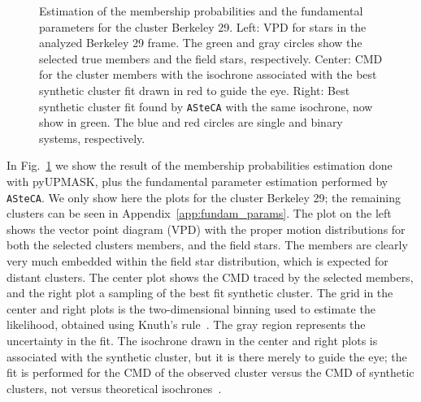 \documentclass{aa}
\begin{document}
  \begin{figure}
   \caption{Estimation of the membership probabilities and the fundamental
    parameters for the cluster Berkeley 29.
    Left: VPD for stars in the analyzed Berkeley 29 frame. The green and gray
    circles show the selected true members and the field stars, respectively.
    Center: CMD for the cluster members with the isochrone associated with the
    best synthetic cluster fit drawn in red to guide the eye.
    Right: Best synthetic cluster fit found by \texttt{ASteCA} with the same
    isochrone, now show in green. The blue and red circles are single and binary
    systems, respectively.}
   \label{fig:BER29_fpars}
  \end{figure}

  In Fig.~\ref{fig:BER29_fpars} we show the result of the membership
  probabilities estimation done with pyUPMASK, plus the fundamental parameter
  estimation performed by \texttt{ASteCA}. We only show here the plots for
  the cluster Berkeley 29; the remaining clusters can be seen in
  Appendix~\ref{app:fundam_params}.
  The plot on the left shows the vector point diagram (VPD) with the proper
  motion distributions for both the selected clusters members, and the field
  stars. The members are clearly very much embedded within the field star
  distribution, which is expected for distant clusters. The center plot shows
  the CMD traced by the selected members, and the right plot a sampling of the
  best fit synthetic cluster. The grid in the center and right plots is
  the  two-dimensional binning used to estimate the likelihood, obtained using
  Knuth's rule~\citep{Knuth_2006}. The gray region represents the uncertainty
  in the fit. The isochrone drawn in the center and right plots is associated
  with the synthetic cluster, but it is there merely to guide the eye; the fit is
  performed for the CMD of the observed cluster versus the CMD of synthetic
  clusters, not versus theoretical isochrones~\citep[this is further
  explained in][]{Perren_2015,Perren_2017,Perren_2020}.\\
\end{document}

